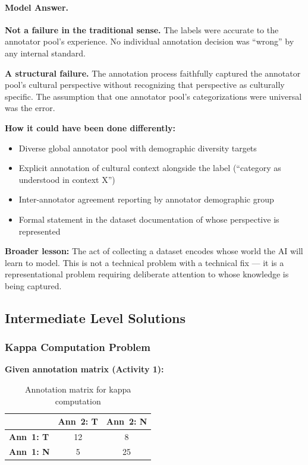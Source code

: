 \paragraph{Model Answer.}

\textbf{Not a failure in the traditional sense.} The labels were accurate to the annotator pool's experience. No individual annotation decision was ``wrong'' by any internal standard.

\textbf{A structural failure.} The annotation process faithfully captured the annotator pool's cultural perspective without recognizing that perspective as culturally specific. The assumption that one annotator pool's categorizations were universal was the error.

\textbf{How it could have been done differently:}
\begin{itemize}
    \item Diverse global annotator pool with demographic diversity targets
    \item Explicit annotation of cultural context alongside the label (``category as understood in context X'')
    \item Inter-annotator agreement reporting by annotator demographic group
    \item Formal statement in the dataset documentation of whose perspective is represented
\end{itemize}

\textbf{Broader lesson:} The act of collecting a dataset encodes whose world the AI will learn to model. This is not a technical problem with a technical fix --- it is a representational problem requiring deliberate attention to whose knowledge is being captured.

\subsection{Intermediate Level Solutions}

\subsubsection{Kappa Computation Problem}

\textbf{Given annotation matrix (Activity 1):}

\begin{table}[htbp]
\caption{Annotation matrix for kappa computation}
\label{tab:kappa-compute-ch07}
\centering
\begin{tabular}{@{}lcc@{}}
\toprule
 & \textbf{Ann~2: T} & \textbf{Ann~2: N} \\
\midrule
\textbf{Ann~1: T} & 12 & 8 \\
\textbf{Ann~1: N} & 5 & 25 \\
\bottomrule
\end{tabular}
\end{table}

